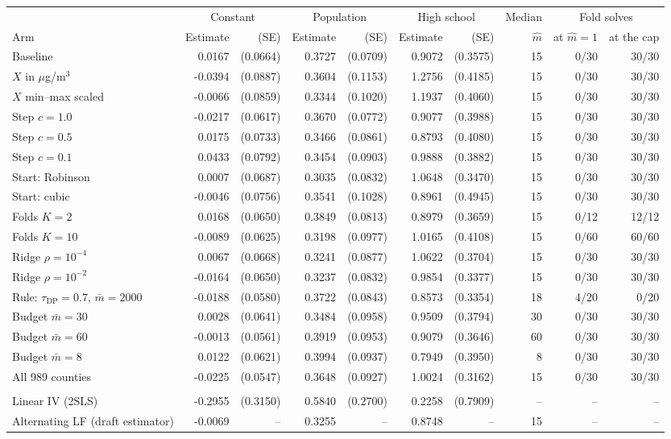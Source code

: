 \begin{tabular}{lrrrrrrrrr}
\toprule
& \multicolumn{2}{c}{Constant} & \multicolumn{2}{c}{Population} & \multicolumn{2}{c}{High school} & Median & \multicolumn{2}{c}{Fold solves} \\
\cmidrule(lr){2-3} \cmidrule(lr){4-5} \cmidrule(lr){6-7} \cmidrule(lr){9-10}
Arm & Estimate & (SE) & Estimate & (SE) & Estimate & (SE) & $\hat m$ & at $\hat m = 1$ & at the cap \\
\midrule
Baseline & 0.0167 & (0.0664) & 0.3727 & (0.0709) & 0.9072 & (0.3575) & 15 & 0/30 & 30/30 \\
$X$ in $\mu$g/m$^3$ & -0.0394 & (0.0887) & 0.3604 & (0.1153) & 1.2756 & (0.4185) & 15 & 0/30 & 30/30 \\
$X$ min--max scaled & -0.0066 & (0.0859) & 0.3344 & (0.1020) & 1.1937 & (0.4060) & 15 & 0/30 & 30/30 \\
Step $c = 1.0$ & -0.0217 & (0.0617) & 0.3670 & (0.0772) & 0.9077 & (0.3988) & 15 & 0/30 & 30/30 \\
Step $c = 0.5$ & 0.0175 & (0.0733) & 0.3466 & (0.0861) & 0.8793 & (0.4080) & 15 & 0/30 & 30/30 \\
Step $c = 0.1$ & 0.0433 & (0.0792) & 0.3454 & (0.0903) & 0.9888 & (0.3882) & 15 & 0/30 & 30/30 \\
Start: Robinson & 0.0007 & (0.0687) & 0.3035 & (0.0832) & 1.0648 & (0.3470) & 15 & 0/30 & 30/30 \\
Start: cubic & -0.0046 & (0.0756) & 0.3541 & (0.1028) & 0.8961 & (0.4945) & 15 & 0/30 & 30/30 \\
Folds $K = 2$ & 0.0168 & (0.0650) & 0.3849 & (0.0813) & 0.8979 & (0.3659) & 15 & 0/12 & 12/12 \\
Folds $K = 10$ & -0.0089 & (0.0625) & 0.3198 & (0.0977) & 1.0165 & (0.4108) & 15 & 0/60 & 60/60 \\
Ridge $\rho = 10^{-4}$ & 0.0067 & (0.0668) & 0.3241 & (0.0877) & 1.0622 & (0.3704) & 15 & 0/30 & 30/30 \\
Ridge $\rho = 10^{-2}$ & -0.0164 & (0.0650) & 0.3237 & (0.0832) & 0.9854 & (0.3377) & 15 & 0/30 & 30/30 \\
Rule: $\tau_{\mathrm{DP}} = 0.7$, $\bar m = 2000$ & -0.0188 & (0.0580) & 0.3722 & (0.0843) & 0.8573 & (0.3354) & 18 & 4/20 & 0/20 \\
Budget $\bar m = 30$ & 0.0028 & (0.0641) & 0.3484 & (0.0958) & 0.9509 & (0.3794) & 30 & 0/30 & 30/30 \\
Budget $\bar m = 60$ & -0.0013 & (0.0561) & 0.3919 & (0.0953) & 0.9079 & (0.3646) & 60 & 0/30 & 30/30 \\
Budget $\bar m = 8$ & 0.0122 & (0.0621) & 0.3994 & (0.0937) & 0.7949 & (0.3950) & 8 & 0/30 & 30/30 \\
All 989 counties & -0.0225 & (0.0547) & 0.3648 & (0.0927) & 1.0024 & (0.3162) & 15 & 0/30 & 30/30 \\
\addlinespace
\multicolumn{10}{l}{\textit{Comparison estimators}} \\
Linear IV (2SLS) & -0.2955 & (0.3150) & 0.5840 & (0.2700) & 0.2258 & (0.7909) & -- & -- & -- \\
Alternating LF (draft estimator) & -0.0069 & -- & 0.3255 & -- & 0.8748 & -- & 15 & -- & -- \\
\bottomrule
\end{tabular}
